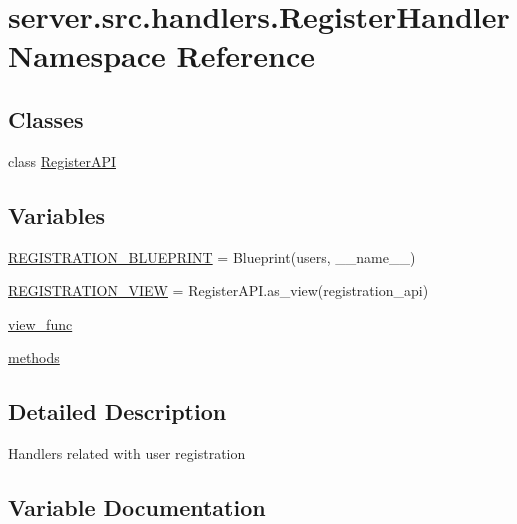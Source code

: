 \hypertarget{namespaceserver_1_1src_1_1handlers_1_1_register_handler}{}\section{server.\+src.\+handlers.\+Register\+Handler Namespace Reference}
\label{namespaceserver_1_1src_1_1handlers_1_1_register_handler}
\subsection*{Classes}
\begin{DoxyCompactItemize}
\item 
class \hyperlink{classserver_1_1src_1_1handlers_1_1_register_handler_1_1_register_a_p_i}{Register\+A\+PI}
\end{DoxyCompactItemize}
\subsection*{Variables}
\begin{DoxyCompactItemize}
\item 
\hyperlink{namespaceserver_1_1src_1_1handlers_1_1_register_handler_a5038917ac0cc3bdfeb7e0ae890fb0ab3}{R\+E\+G\+I\+S\+T\+R\+A\+T\+I\+O\+N\+\_\+\+B\+L\+U\+E\+P\+R\+I\+NT} = Blueprint(\textquotesingle{}users\textquotesingle{}, \+\_\+\+\_\+name\+\_\+\+\_\+)
\item 
\hyperlink{namespaceserver_1_1src_1_1handlers_1_1_register_handler_a02027a84f6d45f7537fef8a6bbe74e9e}{R\+E\+G\+I\+S\+T\+R\+A\+T\+I\+O\+N\+\_\+\+V\+I\+EW} = Register\+A\+P\+I.\+as\+\_\+view(\textquotesingle{}registration\+\_\+api\textquotesingle{})
\item 
\hyperlink{namespaceserver_1_1src_1_1handlers_1_1_register_handler_a6be70d95ab826685feb65087c99c514b}{view\+\_\+func}
\item 
\hyperlink{namespaceserver_1_1src_1_1handlers_1_1_register_handler_a1ef2f67e4e22f57354c300ef05faa2d2}{methods}
\end{DoxyCompactItemize}


\subsection{Detailed Description}
\begin{DoxyVerb}Handlers related with user registration\end{DoxyVerb}
 

\subsection{Variable Documentation}
